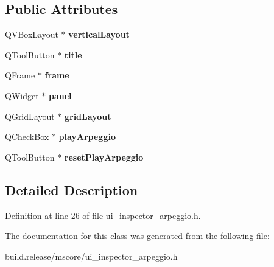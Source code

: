 \subsection*{Public Attributes}
\begin{DoxyCompactItemize}
\item 
\mbox{\label{class_ui___inspector_arpeggio_a09e9c8398279d233152ae720638a0e97}} 
Q\+V\+Box\+Layout $\ast$ {\bfseries vertical\+Layout}
\item 
\mbox{\label{class_ui___inspector_arpeggio_a0a359c5065c3b8338da0f08d0dbefe82}} 
Q\+Tool\+Button $\ast$ {\bfseries title}
\item 
\mbox{\label{class_ui___inspector_arpeggio_ace3508cd85e76a6aec4e93d6cd6ed1d5}} 
Q\+Frame $\ast$ {\bfseries frame}
\item 
\mbox{\label{class_ui___inspector_arpeggio_abeb6bddf82fa8f855b38b3f010a254f7}} 
Q\+Widget $\ast$ {\bfseries panel}
\item 
\mbox{\label{class_ui___inspector_arpeggio_abb9e83b634f3c0403ba25a6386997df5}} 
Q\+Grid\+Layout $\ast$ {\bfseries grid\+Layout}
\item 
\mbox{\label{class_ui___inspector_arpeggio_aa627d2b2c890007040e3cde216cceaa4}} 
Q\+Check\+Box $\ast$ {\bfseries play\+Arpeggio}
\item 
\mbox{\label{class_ui___inspector_arpeggio_a2eda75b117b1e06a9effb6920db0dfc5}} 
Q\+Tool\+Button $\ast$ {\bfseries reset\+Play\+Arpeggio}
\end{DoxyCompactItemize}


\subsection{Detailed Description}


Definition at line 26 of file ui\+\_\+inspector\+\_\+arpeggio.\+h.



The documentation for this class was generated from the following file\+:\begin{DoxyCompactItemize}
\item 
build.\+release/mscore/ui\+\_\+inspector\+\_\+arpeggio.\+h\end{DoxyCompactItemize}
